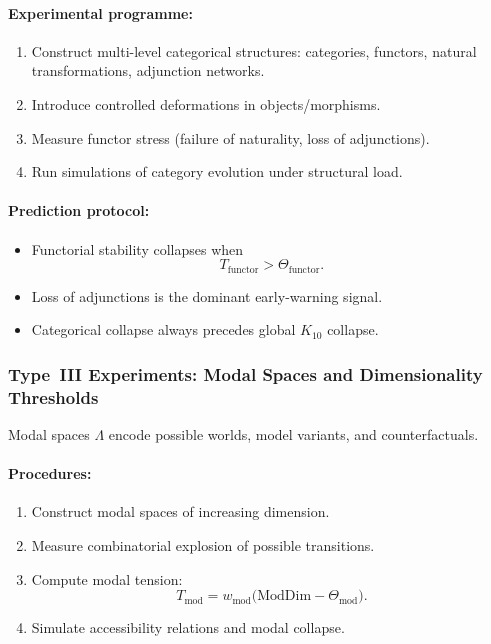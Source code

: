 \paragraph{Experimental programme:}

\begin{enumerate}
    \item Construct multi-level categorical structures:
          categories, functors, natural transformations,
          adjunction networks.
    \item Introduce controlled deformations in objects/morphisms.
    \item Measure functor stress 
          (failure of naturality, loss of adjunctions).
    \item Run simulations of category evolution under structural load.
\end{enumerate}

\paragraph{Prediction protocol:}

\begin{itemize}
    \item Functorial stability collapses when
          \[
              T_{\mathrm{functor}} > \Theta_{\mathrm{functor}}.
          \]
    \item Loss of adjunctions is the dominant early-warning signal.
    \item Categorical collapse always precedes global 
          $K_{10}$ collapse.
\end{itemize}



\subsubsection{Type~III Experiments: Modal Spaces and Dimensionality Thresholds}

Modal spaces $\Lambda$ encode possible worlds, model variants, and 
counterfactuals.

\paragraph{Procedures:}

\begin{enumerate}
    \item Construct modal spaces of increasing dimension.
    \item Measure combinatorial explosion of possible transitions.
    \item Compute modal tension:
          \[
              T_{\mathrm{mod}} = 
              w_{\mathrm{mod}}\bigl(
                  \mathrm{ModDim} - \Theta_{\mathrm{mod}}
              \bigr).
          \]
    \item Simulate accessibility relations and modal collapse.
\end{enumerate}

